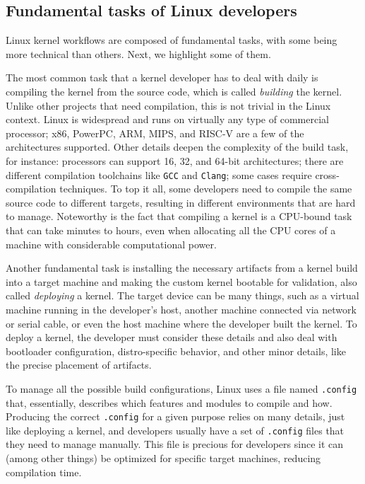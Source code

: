 \subsection{Fundamental tasks of Linux developers}
\label{sec:background:linux-tasks}

Linux kernel workflows are composed of fundamental tasks, with some being more
technical than others. Next, we highlight some of them.

The most common task that a kernel developer has to deal with daily is compiling
the kernel from the source code, which is called \textit{building} the kernel.
Unlike other projects that need compilation, this is not trivial in the Linux
context. Linux is widespread and runs on virtually any type of commercial
processor; x86, PowerPC, ARM, MIPS, and RISC-V are a few of the architectures
supported. Other details deepen the complexity of the build task, for instance:
processors can support 16, 32, and 64-bit architectures; there are different
compilation toolchains like \texttt{GCC} and \texttt{Clang}; some cases require
cross-compilation techniques. To top it all, some developers need to compile the
same source code to different targets, resulting in different environments that
are hard to manage. Noteworthy is the fact that compiling a kernel is a
CPU-bound task that can take minutes to hours, even when allocating all the CPU
cores of a machine with considerable computational power.

Another fundamental task is installing the necessary artifacts from a kernel
build into a target machine and making the custom kernel bootable for
validation, also called \textit{deploying} a kernel. The target device can be
many things, such as a virtual machine running in the developer's host, another
machine connected via network or serial cable, or even the host machine where
the developer built the kernel. To deploy a kernel, the developer must consider
these details and also deal with bootloader configuration, distro-specific
behavior, and other minor details, like the precise placement of artifacts.

To manage all the possible build configurations, Linux uses a file named
\texttt{.config} that, essentially, describes which features and modules to
compile and how. Producing the correct \texttt{.config} for a given purpose
relies on many details, just like deploying a kernel, and developers usually
have a set of \texttt{.config} files that they need to manage manually. This
file is precious for developers since it can (among other things) be optimized
for specific target machines, reducing compilation time.


